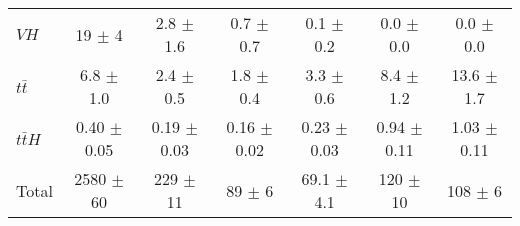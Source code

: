 \begin{tabular}{|l|c|c|c|c|c|c|}
  $VH$   & 19 $\pm$ 4 & 2.8 $\pm$ 1.6 & 0.7 $\pm$ 0.7 & 0.1 $\pm$ 0.2 & 0.0 $\pm$ 0.0 & 0.0 $\pm$ 0.0 \\ 
  $t\bar{t}$   & 6.8 $\pm$ 1.0 & 2.4 $\pm$ 0.5 & 1.8 $\pm$ 0.4 & 3.3 $\pm$ 0.6 & 8.4 $\pm$ 1.2 & 13.6 $\pm$ 1.7 \\ 
  $t\bar{t}H$   & 0.40 $\pm$ 0.05 & 0.19 $\pm$ 0.03 & 0.16 $\pm$ 0.02 & 0.23 $\pm$ 0.03 & 0.94 $\pm$ 0.11 & 1.03 $\pm$ 0.11 \\ 
\hline 
  Total  & 2580 $\pm$ 60 & 229 $\pm$ 11 & 89 $\pm$ 6 & 69.1 $\pm$ 4.1 & 120 $\pm$ 10 & 108 $\pm$ 6 \\ 
\hline 
\end{tabular} 

